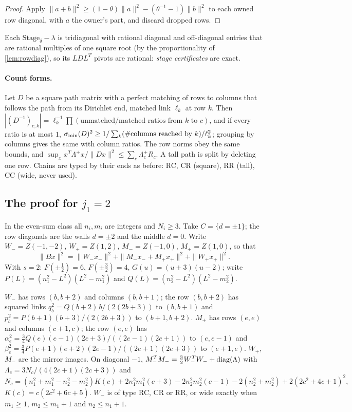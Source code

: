 \begin{proof}
Apply $\|a+b\|^2\ge(1-\theta)\|a\|^2-(\theta^{-1}-1)\|b\|^2$ to each owned row diagonal, with $a$ the
owner's part, and discard dropped rows.
\end{proof}

Each $\mathrm{Stage}_\delta-\lambda$ is tridiagonal with rational diagonal and off-diagonal
entries that are rational multiples of one square root (by the proportionality of
\cref{lem:rowdiag}), so its $LDL^T$ pivots are rational: \emph{stage certificates} are exact.

\paragraph{Count forms.}
Let $D$ be a square path matrix with a perfect matching of rows to columns that follows the
path from its Dirichlet end, matched link $\ell_k$ at row $k$. Then
$|(D^{-1})_{c,k}|=\ell_k^{-1}\prod(\text{unmatched}/\text{matched ratios from }k\text{ to }c)$,
and if every ratio is at most $1$, $\sigma_{\min}(D)^2\ge1/\sum_k(\#\text{columns reached by }k)/\ell_k^2$;
grouping by columns gives the same with column ratios. The row norms obey the same bounds,
and $\sup_xx^T\Lambda^+x/\|Dx\|^2\le\sum_c\Lambda^+_cR_c$. A tall path is split by deleting one row.
Chains are typed by their ends as before: RC, CR (square), RR (tall), CC (wide, never used).

\subsection{The proof for \texorpdfstring{$j_1=2$}{j1 = 2}}

In the even-sum class all $n_i,m_i$ are integers and $N_i\ge3$. Take $C=\{d=\pm1\}$; the row
diagonals are the walls $d=\pm2$ and the middle $d=0$. Write $W_-=Z(-1,-2)$, $W_+=Z(1,2)$,
$M_-=Z(-1,0)$, $M_+=Z(1,0)$, so that
\begin{equation}\label{eq:j2split}
  \|Bx\|^2=\|W_-x_-\|^2+\|M_-x_-+M_+x_+\|^2+\|W_+x_+\|^2 .
\end{equation}
With $s=2$: $F(\pm\frac12)=6$, $F(\pm\frac32)=4$, $G(u)=(u+3)(u-2)$; write $P(L)=(n_1^2-L^2)(L^2-m_1^2)$
and $Q(L)=(n_2^2-L^2)(L^2-m_2^2)$.

\begin{lemma}[Chains]\label{lem:j2chains}
$W_-$ has rows $(b,b+2)$ and columns $(b,b+1)$; the row $(b,b+2)$ has squared links
$q_b^2=Q(b+2)\,b/(2(2b+3))$ to $(b,b+1)$ and $p_b^2=P(b+1)(b+3)/(2(2b+3))$ to $(b+1,b+2)$.
$M_+$ has rows $(e,e)$ and columns $(c+1,c)$; the row $(e,e)$ has
$\alpha_e^2=\frac34Q(e)(e-1)(2e+3)/((2e-1)(2e+1))$ to $(e,e-1)$ and
$\beta_e^2=\frac34P(e+1)(e+2)(2e-1)/((2e+1)(2e+3))$ to $(e+1,e)$. $W_+$, $M_-$ are the mirror
images. On diagonal $-1$, $M_-^TM_-=\frac32W_-^TW_-+\operatorname{diag}(\Lambda)$ with
$\Lambda_c=3N_c/(4(2c+1)(2c+3))$ and
\[
  N_c=(n_1^2+m_1^2-n_2^2-m_2^2)K(c)+2n_1^2m_1^2(c+3)-2n_2^2m_2^2(c-1)-2(n_2^2+m_2^2)+2(2c^2+4c+1)^2,
\]
$K(c)=c(2c^2+6c+5)$. $W_-$ is of type RC, CR or RR, or wide exactly when $m_1\ge1$,
$m_2\le m_1+1$ and $n_2\le n_1+1$.
\end{lemma}


